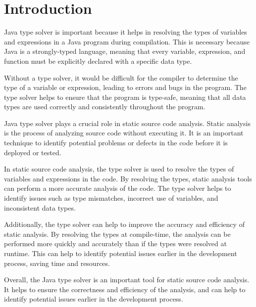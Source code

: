 \section{Introduction}
\label{sec:intro}

Java type solver is important because it helps in resolving the types of variables and expressions in a Java program during compilation. This is necessary because Java is a strongly-typed language, meaning that every variable, expression, and function must be explicitly declared with a specific data type. 

Without a type solver, it would be difficult for the compiler to determine the type of a variable or expression, leading to errors and bugs in the program. The type solver helps to ensure that the program is type-safe, meaning that all data types are used correctly and consistently throughout the program.

Java type solver plays a crucial role in static source code analysis. Static analysis is the process of analyzing source code without executing it. It is an important technique to identify potential problems or defects in the code before it is deployed or tested.

In static source code analysis, the type solver is used to resolve the types of variables and expressions in the code. By resolving the types, static analysis tools can perform a more accurate analysis of the code. The type solver helps to identify issues such as type mismatches, incorrect use of variables, and inconsistent data types.

Additionally, the type solver can help to improve the accuracy and efficiency of static analysis. By resolving the types at compile-time, the analysis can be performed more quickly and accurately than if the types were resolved at runtime. This can help to identify potential issues earlier in the development process, saving time and resources.

Overall, the Java type solver is an important tool for static source code analysis. It helps to ensure the correctness and efficiency of the analysis, and can help to identify potential issues earlier in the development process.
